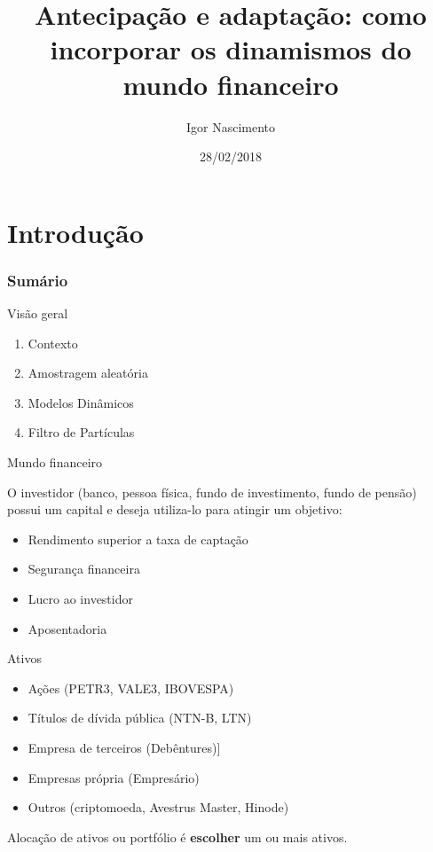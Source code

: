\documentclass{beamer}
\title[Artigo]{Antecipação e adaptação: como incorporar os dinamismos do mundo financeiro}
\author[Igor Nascimento]{Igor Nascimento}
\institute[LAMFO]{Laboratório de Aprendizado de Máquina em Finanças e Organizações - LAMFO}
\date[2018]{28/02/2018}
\begin{document}
\begin{frame}
  \titlepage
\end{frame}

\section{Introdução}

\begin{frame}
\frametitle{Sumário}
\tableofcontents
\end{frame}



\begin{frame}{Visão geral}


\vspace{.15cm}
\begin{enumerate}
\item Contexto
\vspace{.15cm}
\item Amostragem aleatória
\vspace{.15cm}
\item Modelos Dinâmicos
\vspace{.15cm}
\item Filtro de Partículas
\end{enumerate}

\end{frame}



\begin{frame}{Mundo financeiro}

O investidor (banco, pessoa física, fundo de investimento, fundo de pensão) possui um capital e deseja utiliza-lo para atingir um objetivo:

\begin{itemize}
\item Rendimento superior a taxa de captação 
\item Segurança financeira
\item Lucro ao investidor
\item Aposentadoria
\end{itemize}

\end{frame}

\begin{frame}{Ativos}

\begin{itemize}
\item Ações (PETR3, VALE3, IBOVESPA)
\pause
\item Títulos de dívida pública (NTN-B, LTN)
\pause
\item Empresa de terceiros (Debêntures)]
\pause
\item Empresas própria (Empresário)
\pause
\item Outros (criptomoeda, Avestrus Master, Hinode)
\end{itemize}

Alocação de ativos ou portfólio é \textbf{escolher} um ou mais ativos.


\end{frame}
\end{document}
